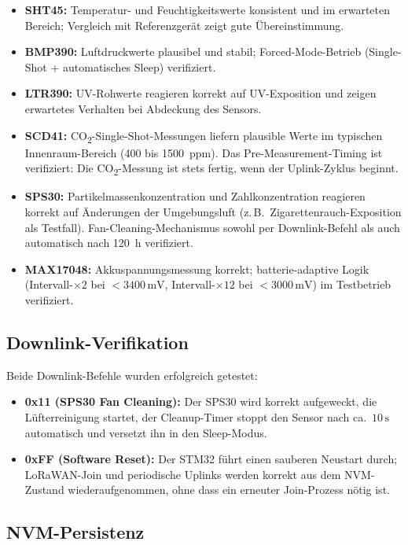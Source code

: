 \begin{itemize}
  \item \textbf{SHT45:} Temperatur- und Feuchtigkeitswerte konsistent und im erwarteten Bereich; Vergleich mit Referenzgerät zeigt gute Übereinstimmung.
  \item \textbf{BMP390:} Luftdruckwerte plausibel und stabil; Forced-Mode-Betrieb (Single-Shot + automatisches Sleep) verifiziert.
  \item \textbf{LTR390:} UV-Rohwerte reagieren korrekt auf UV-Exposition und zeigen erwartetes Verhalten bei Abdeckung des Sensors.
  \item \textbf{SCD41:} CO\textsubscript{2}-Single-Shot-Messungen liefern plausible Werte im typischen Innenraum-Bereich (400 bis 1500~ppm). Das Pre-Measurement-Timing ist verifiziert: Die CO\textsubscript{2}-Messung ist stets fertig, wenn der Uplink-Zyklus beginnt.
  \item \textbf{SPS30:} Partikelmassenkonzentration und Zahlkonzentration reagieren korrekt auf Änderungen der Umgebungsluft (z.\,B.\ Zigarettenrauch-Exposition als Testfall). Fan-Cleaning-Mechanismus sowohl per Downlink-Befehl als auch automatisch nach 120~h verifiziert.
  \item \textbf{MAX17048:} Akkuspannungsmessung korrekt; batterie-adaptive Logik (Intervall-$\times2$ bei $< 3400\,\text{mV}$, Intervall-$\times12$ bei $< 3000\,\text{mV}$) im Testbetrieb verifiziert.
\end{itemize}

\subsection*{Downlink-Verifikation}

Beide Downlink-Befehle wurden erfolgreich getestet:

\begin{itemize}
  \item \textbf{0x11 (SPS30 Fan Cleaning):} Der SPS30 wird korrekt aufgeweckt, die Lüfterreinigung startet, der Cleanup-Timer stoppt den Sensor nach ca.\ $10\,\text{s}$ automatisch und versetzt ihn in den Sleep-Modus.
  \item \textbf{0xFF (Software Reset):} Der STM32 führt einen sauberen Neustart durch; LoRaWAN-Join und periodische Uplinks werden korrekt aus dem NVM-Zustand wiederaufgenommen, ohne dass ein erneuter Join-Prozess nötig ist.
\end{itemize}

\subsection*{NVM-Persistenz}


